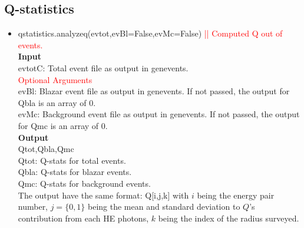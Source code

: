 \documentclass[article, superscriptaddress, ctexart, nofootinbib]{revtex4}
\newcommand{\tcr}{\textcolor{red}}
\begin{document}
\subsection{Q-statistics}
\begin{itemize}
 \item{qstatistics.analyzeq(evtot,evBl=False,evMc=False) \tcr{|| Computed Q out of events.}}\\
  {\bf{Input}}\\
  evtotC: Total event file as output in genevents. \\
 \tcr{Optional Arguments}\\
 evBl: Blazar event file as output in genevents. If not passed, the output for Qbla is an array of 0. \\
 evMc: Background event file as output in genevents. If not passed, the output for Qmc is an array of 0. \\
     \newline
 {\bf{Output}}\\
 Qtot,Qbla,Qmc\\
 Qtot: Q-stats for total events. \\
 Qbla: Q-stats for blazar events. \\
 Qmc: Q-stats for background events. \\
 The output have the same format: Q[i,j,k] with $i$ being the energy pair number, $j=\{0,1\}$ being the mean and standard deviation to $Q$'s contribution from each HE photons, $k$ being the index of the radius surveyed.

\end{itemize}
\end{document}
